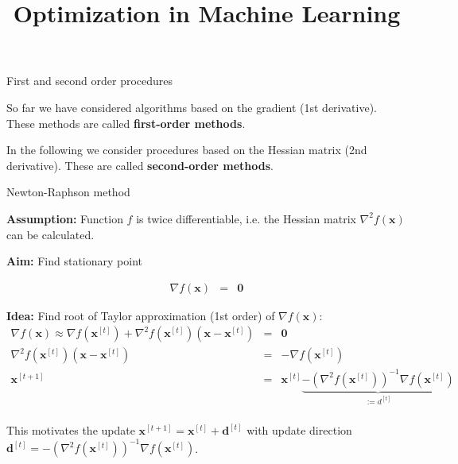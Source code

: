 \documentclass[11pt,compress,t,notes=noshow, xcolor=table]{beamer}
\title{Optimization in Machine Learning}
\date{}
\begin{document}
\sloppy

\begin{vbframe}{First and second order procedures}

So far we have considered algorithms based on the gradient (1st derivative). These methods are called \textbf{first-order methods}.

\lz

In the following we consider procedures based on the Hessian matrix (2nd derivative). These are called \textbf{second-order methods}.

\end{vbframe}

\begin{vbframe}{Newton-Raphson method}

\textbf{Assumption:} Function $f$ is twice differentiable, i.e. the Hessian matrix $\nabla^2 f(\bm{x})$ can be calculated.

\lz

\textbf{Aim:} Find stationary point

\vspace*{-0.2cm}
\begin{eqnarray*}
\nabla f(\bm{x}) &=& \bm{0}
\end{eqnarray*}

\textbf{Idea:} Find root of Taylor approximation (1st order) of $\nabla f(\bm{x})$:
\begin{eqnarray*}
\nabla f(\mathbf{x}) \approx \nabla f(\mathbf{x}^{[t]}) +
\nabla^2 f(\mathbf{x}^{[t]})(\mathbf{x} - \mathbf{x}^{[t]}) &=& \mathbf{0} \\
\nabla^2 f(\mathbf{x}^{[t]})(\mathbf{x} - \mathbf{x}^{[t]}) &=& - \nabla f(\mathbf{x}^{[t]}) \\
\mathbf{x}^{[t+1]} &=& \mathbf{x}^{[t]} \underbrace{- \left(\nabla^2 f(\mathbf{x}^{[t]})\right)^{-1}\nabla f(\mathbf{x}^{[t]})}_{:= d^{[t]}} \\
\end{eqnarray*}

\vspace*{-0.2cm}

This motivates the update $\bm{x}^{[t+1]} = \bm{x}^{[t]} + \bm{d}^{[t]}$ with update direction $\bm{d}^{[t]} = - \left(\nabla^2 f(\mathbf{ x}^{[t]})\right)^{-1}\nabla f(\mathbf{x}^{[t]})$.


\end{vbframe}
\end{document}
